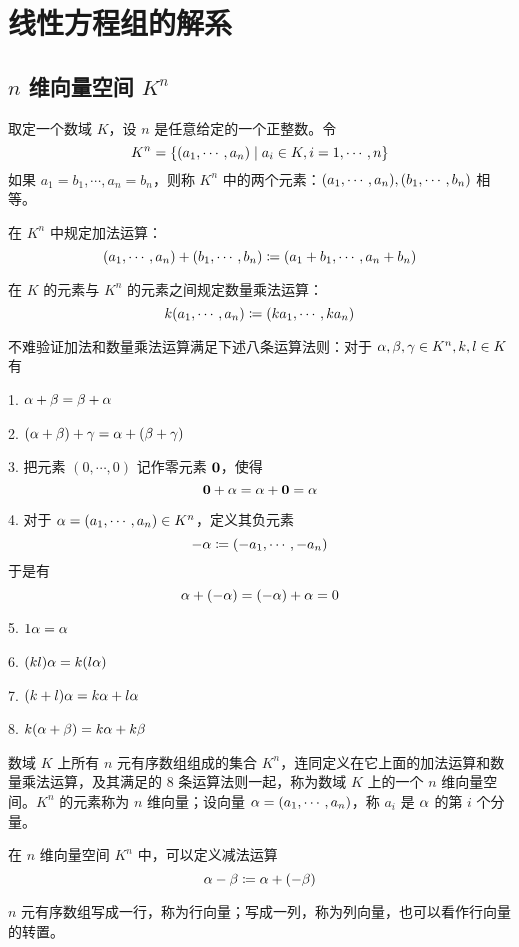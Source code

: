 \chapter{线性方程组的解系}

\section{\texorpdfstring{$n$ 维向量空间 $K^n$}{n 维向量空间 Kn}}

取定一个数域 $K$，设 $n$ 是任意给定的一个正整数。令
\[K^n=\{(a_1,\cdots,a_n) \mid a_i\in K,i=1,\cdots,n\}\]
如果 $a_1=b_1,\cdots,a_n=b_n$，则称 $K^n$ 中的两个元素：$(a_1,\cdots,a_n),(b_1,\cdots,b_n)$ 相等。

在 $K^n$ 中规定加法运算：
\[(a_1,\cdots,a_n)+(b_1,\cdots,b_n)\coloneqq (a_1+b_1,\cdots,a_n+b_n)\]

在 $K$ 的元素与 $K^n$ 的元素之间规定数量乘法运算：
\[k(a_1,\cdots,a_n) \coloneqq  (ka_1,\cdots,ka_n)\]

不难验证加法和数量乘法运算满足下述八条运算法则：对于 $\alpha,\beta,\gamma\in K^n,k,l\in K$ 有

1. $\alpha+\beta=\beta+\alpha$

2. $(\alpha+\beta)+\gamma=\alpha+(\beta+\gamma)$

3. 把元素 $(0,\cdots,0)$ 记作零元素 $\boldsymbol{0}$，使得
\[\boldsymbol{0} + \alpha = \alpha + \boldsymbol{0} = \alpha\]

4. 对于 $\alpha = (a_1,\cdots,a_n)\in K^n$，定义其负元素
\[-\alpha \coloneqq  (-a_1,\cdots,-a_n)\]
于是有
\[\alpha + (-\alpha) = (-\alpha)+\alpha = 0\]

5. $1\alpha = \alpha$

6. $(kl)\alpha = k(l\alpha)$

7. $(k+l)\alpha = k\alpha + l\alpha$

8. $k (\alpha+\beta) = k\alpha + k\beta$

\begin{definition}[$n$ 维向量空间]
	数域 $K$ 上所有 $n$ 元有序数组组成的集合 $K^n$，连同定义在它上面的加法运算和数量乘法运算，及其满足的 8 条运算法则一起，称为数域 $K$ 上的一个 $n$ 维向量空间。$K^n$ 的元素称为 $n$ 维向量；设向量 $\alpha  = (a_1,\cdots,a_n)$，称 $a_i$ 是 $\alpha$ 的第 $i$ 个分量。
\end{definition}

在 $n$ 维向量空间 $K^n$ 中，可以定义减法运算
\[\alpha - \beta \coloneqq  \alpha + (-\beta)\]

$n$ 元有序数组写成一行，称为行向量；写成一列，称为列向量，也可以看作行向量的转置。

